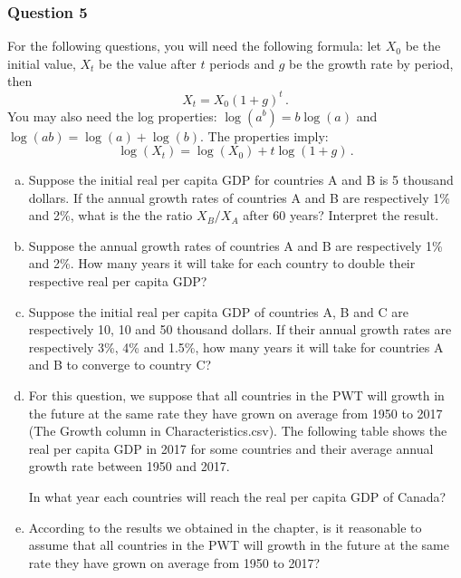 \documentclass[letterpaper]{article}\usepackage[]{graphicx}\usepackage[]{color}
\numberwithin{exer}{section}
\theoremstyle{nonumberplain}
\begin{document}
\subsubsection*{Question 5}
For the following questions, you will need the following formula: let
$X_0$ be the initial value, $X_t$ be the value after $t$ periods and
$g$ be the growth rate by period, then
\[
X_t = X_0(1+g)^t\,.
\]
You may also need the log properties: $\log(a^b)=b\log(a)$ and
$\log(ab)=\log(a)+\log(b)$. The properties imply:
\[
\log(X_t) = \log(X_0) + t\log(1+g)\,.
\]
\begin{enumerate}[a)]
\item Suppose the initial real per capita GDP for countries A and B is 
  5 thousand dollars. If the annual growth rates of countries A and B
  are respectively 1\% and 2\%, what is the the ratio $X_B/X_A$ after
  60 years? Interpret the result.
\item Suppose the annual growth rates of countries A and B are
  respectively 1\% and 2\%. How many years it will take for each
  country to double their respective real per capita GDP?
\item Suppose the initial real per capita GDP of countries A, B and C
  are respectively 10, 10 and 50 thousand dollars. If their annual
  growth rates are respectively 3\%, 4\% and 1.5\%, how many years it
  will take for countries A and B to converge to country C?
\item For this question, we suppose that all countries in the PWT will
  growth in the future at the same rate they have grown on average
  from 1950 to 2017 (The Growth column in Characteristics.csv). The
  following table shows the real per capita GDP in 2017 for some
  countries and their average annual growth rate between 1950 and
  2017.
\begin{center}
\end{center}
In what year each countries will reach the real per capita GDP of
Canada?
\item According to the results we obtained in the chapter, is it
  reasonable to assume that all countries in the PWT will
  growth in the future at the same rate they have grown on average
  from 1950 to 2017?
\end{enumerate}
\end{document}
